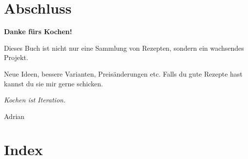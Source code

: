 \documentclass[
  a4paper,
  twoside,
  11pt
]{article}
\begin{document}







\clearpage
{}
\section{Abschluss}

\begin{center}
\vspace{2cm}

{\Huge \textbf{Danke fürs Kochen!}}

\vspace{1cm}

Dieses Buch ist nicht nur eine Sammlung von Rezepten,  
sondern ein wachsendes Projekt.

\vspace{0.5cm}

Neue Ideen, bessere Varianten, Preisänderungen etc. Falls du gute Rezepte hast kannst du sie mir gerne schicken.

\vspace{1cm}

\textit{Kochen ist Iteration.}

\vfill

\Large
Adrian\\
\the\year%
\end{center}
\clearpage





\clearpage
\section*{Index}
\printindex
\end{document}
